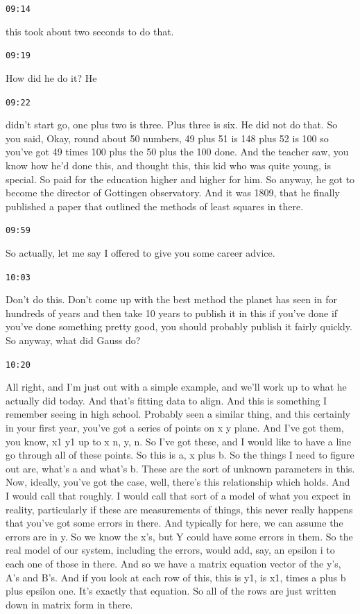 \documentclass[11pt,a4paper]{article}
\newcommand{\timestamp}[1]{%
  \par\vspace{0.35em}%
  \noindent\colorbox{timestampback}{\textcolor{timestampblue}{\small\texttt{#1}}}%
  \par\vspace{0.2em}%
}
\begin{document}
\timestamp{09:14}

this took about two seconds to do that.



\timestamp{09:19}

How did he do it? He



\timestamp{09:22}

didn't start go, one plus two is three. Plus three is six. He did not do that. So you said, Okay, round about 50 numbers, 49 plus 51 is 148 plus 52 is 100 so you've got 49 times 100 plus the 50 plus the 100 done. And the teacher saw, you know how he'd done this, and thought this, this kid who was quite young, is special. So paid for the education higher and higher for him. So anyway, he got to become the director of Gottingen observatory. And it was 1809, that he finally published a paper that outlined the methods of least squares in there.



\timestamp{09:59}

So actually, let me say I offered to give you some career advice.



\timestamp{10:03}

Don't do this. Don't come up with the best method the planet has seen in for hundreds of years and then take 10 years to publish it in this if you've done if you've done something pretty good, you should probably publish it fairly quickly. So anyway, what did Gauss do?



\timestamp{10:20}

All right, and I'm just out with a simple example, and we'll work up to what he actually did today. And that's fitting data to align. And this is something I remember seeing in high school. Probably seen a similar thing, and this certainly in your first year, you've got a series of points on x y plane. And I've got them, you know, x1 y1 up to x n, y, n. So I've got these, and I would like to have a line go through all of these points. So this is a, x plus b. So the things I need to figure out are, what's a and what's b. These are the sort of unknown parameters in this. Now, ideally, you've got the case, well, there's this relationship which holds. And I would call that roughly. I would call that sort of a model of what you expect in reality, particularly if these are measurements of things, this never really happens that you've got some errors in there. And typically for here, we can assume the errors are in y. So we know the x's, but Y could have some errors in them. So the real model of our system, including the errors, would add, say, an epsilon i to each one of those in there. And so we have a matrix equation vector of the y's, A's and B's. And if you look at each row of this, this is y1, is x1, times a plus b plus epsilon one. It's exactly that equation. So all of the rows are just written down in matrix form in there.
\end{document}
